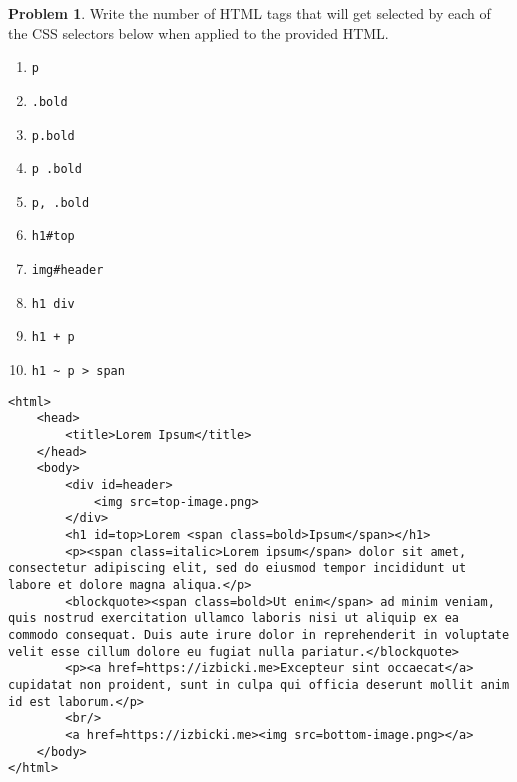 \documentclass[10pt]{article}
\theoremstyle{definition}
\newtheorem{problem}{Problem}
\begin{document}
\noindent
\begin{problem}
    Write the number of HTML tags that will get selected by each of the CSS selectors below when applied to the provided HTML.

\begin{enumerate}[before=\setlength{\baselineskip}{8mm}]

    \item
    \lstinline{p}

    \item
    \lstinline{.bold}

    \item
    \lstinline{p.bold}

    \item
    \lstinline{p .bold}

    \item
    \lstinline{p, .bold}

    \item
    \lstinline{h1#top}

    \item
    \lstinline{img#header}

    \item
    \lstinline{h1 div}

    \item
    \lstinline{h1 + p}

    \item
    \lstinline{h1 ~ p > span}

\end{enumerate}
\end{problem}

\newpage
\begin{lstlisting}
<html>
    <head>
        <title>Lorem Ipsum</title>
    </head>
    <body>
        <div id=header>
            <img src=top-image.png>
        </div>
        <h1 id=top>Lorem <span class=bold>Ipsum</span></h1>
        <p><span class=italic>Lorem ipsum</span> dolor sit amet, consectetur adipiscing elit, sed do eiusmod tempor incididunt ut labore et dolore magna aliqua.</p>
        <blockquote><span class=bold>Ut enim</span> ad minim veniam, quis nostrud exercitation ullamco laboris nisi ut aliquip ex ea commodo consequat. Duis aute irure dolor in reprehenderit in voluptate velit esse cillum dolore eu fugiat nulla pariatur.</blockquote>
        <p><a href=https://izbicki.me>Excepteur sint occaecat</a> cupidatat non proident, sunt in culpa qui officia deserunt mollit anim id est laborum.</p>
        <br/>
        <a href=https://izbicki.me><img src=bottom-image.png></a>
    </body>
</html>
\end{lstlisting}
\end{document}
